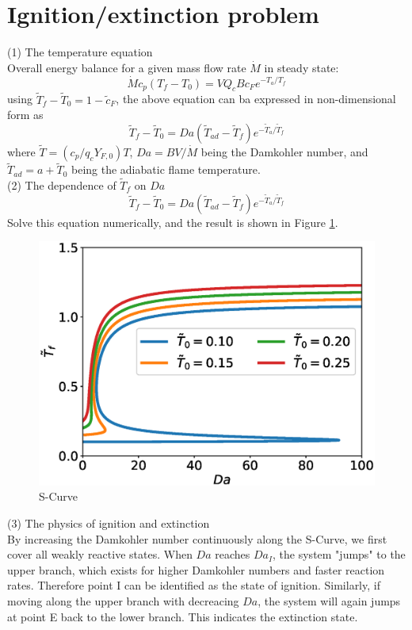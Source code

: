\documentclass[a4paper, 11pt]{article}
\begin{document}
\section{Ignition/extinction problem}

(1) The temperature equation\\
Overall energy balance for a given mass flow rate $\dot{M}$ in steady state:
$$
    \dot{M}c_p(T_f-T_0)=VQ_cBc_Fe^{-T_a/T_f}
$$
using $\tilde{T}_f-\tilde{T}_0=1-\tilde{c}_F$, the above equation can ba expressed in non-dimensional form as
$$
    \tilde{T}_f-\tilde{T}_0=Da(\tilde{T}_{ad} - \tilde{T}_f) e^{-\tilde{T}_a / \tilde{T}_f}
$$
where $\tilde{T}=(c_p/q_cY_{F,0})T$, $Da=BV/\dot{M}$ being the Damkohler number, and $\tilde{T}_{ad}=a+\tilde{T}_0$ being the adiabatic flame temperature.\\

(2) The dependence of $\tilde{T}_f$ on $Da$\\
$$
    \tilde{T}_f-\tilde{T}_0=Da(\tilde{T}_{ad} - \tilde{T}_f) e^{-\tilde{T}_a / \tilde{T}_f}
$$
Solve this equation numerically, and the result is shown in Figure \ref{fig:sCurve}.\\

\begin{figure}[htpb]
\centering
\includegraphics[scale=0.5]{SCurve.eps}
\caption{S-Curve}
\label{fig:sCurve}
\end{figure}

(3) The physics of ignition and extinction\\
By increasing the Damkohler number continuously along the S-Curve, we first cover all weakly reactive states. When $Da$ reaches $Da_I$, the system "jumps" to the upper branch, which exists for higher Damkohler numbers and faster reaction rates. Therefore point I can be identified as the state of ignition. Similarly, if moving along the upper branch with decreacing $Da$, the system will again jumps at point E back to the lower branch. This indicates the extinction state.
\end{document}
